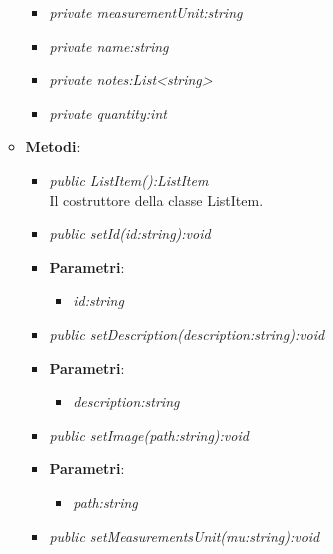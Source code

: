 \begin{itemize}
\begin{itemize}
\begin{itemize}
	\item \textit{private measurementUnit:string}\\
	
	\item \textit{private name:string}\\
	
	\item \textit{private notes:List<string>}\\
	
	\item \textit{private quantity:int}\\
	
	\end{itemize}
\item \textbf{Metodi}:
	\begin{itemize}
	\item \textit{public ListItem():ListItem}\\
	Il costruttore della classe ListItem.
	\item \textit{public setId(id:string):void}\\
	
				\item{\textbf{Parametri}: \begin{itemize}
				\item \textit{id:string}\\

			\end{itemize}}
	\item \textit{public setDescription(description:string):void}\\
	
				\item{\textbf{Parametri}: \begin{itemize}
				\item \textit{description:string}\\

			\end{itemize}}
	\item \textit{public setImage(path:string):void}\\
	
				\item{\textbf{Parametri}: \begin{itemize}
				\item \textit{path:string}\\

			\end{itemize}}
	\item \textit{public setMeasurementsUnit(mu:string):void}\\
	

\end{itemize}
\end{itemize}
\end{itemize}
